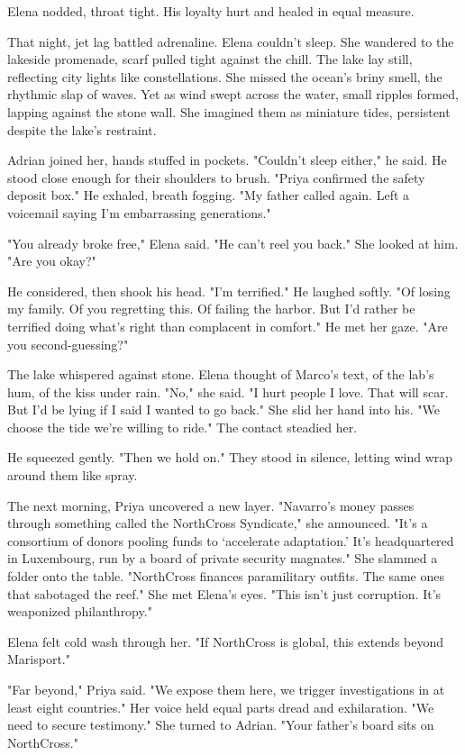 Elena nodded, throat tight. His loyalty hurt and healed in equal measure.

That night, jet lag battled adrenaline. Elena couldn't sleep. She wandered to the lakeside promenade, scarf pulled tight against the chill. The lake lay still, reflecting city lights like constellations. She missed the ocean's briny smell, the rhythmic slap of waves. Yet as wind swept across the water, small ripples formed, lapping against the stone wall. She imagined them as miniature tides, persistent despite the lake's restraint.

Adrian joined her, hands stuffed in pockets. "Couldn't sleep either," he said. He stood close enough for their shoulders to brush. "Priya confirmed the safety deposit box." He exhaled, breath fogging. "My father called again. Left a voicemail saying I'm embarrassing generations."

"You already broke free," Elena said. "He can't reel you back." She looked at him. "Are you okay?"

He considered, then shook his head. "I'm terrified." He laughed softly. "Of losing my family. Of you regretting this. Of failing the harbor. But I'd rather be terrified doing what's right than complacent in comfort." He met her gaze. "Are you second-guessing?"

The lake whispered against stone. Elena thought of Marco's text, of the lab's hum, of the kiss under rain. "No," she said. "I hurt people I love. That will scar. But I'd be lying if I said I wanted to go back." She slid her hand into his. "We choose the tide we're willing to ride." The contact steadied her.

He squeezed gently. "Then we hold on." They stood in silence, letting wind wrap around them like spray.

The next morning, Priya uncovered a new layer. "Navarro's money passes through something called the NorthCross Syndicate," she announced. "It's a consortium of donors pooling funds to `accelerate adaptation.' It's headquartered in Luxembourg, run by a board of private security magnates." She slammed a folder onto the table. "NorthCross finances paramilitary outfits. The same ones that sabotaged the reef." She met Elena's eyes. "This isn't just corruption. It's weaponized philanthropy."

Elena felt cold wash through her. "If NorthCross is global, this extends beyond Marisport."

"Far beyond," Priya said. "We expose them here, we trigger investigations in at least eight countries." Her voice held equal parts dread and exhilaration. "We need to secure testimony." She turned to Adrian. "Your father's board sits on NorthCross."

